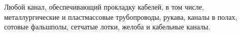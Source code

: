 Любой канал, обеспечивающий прокладку кабелей, в том числе,
металлургические и пластмассовые трубопроводы, рукава, каналы в
полах, сотовые фальшполы, сетчатые лотки, желоба и кабельные каналы.